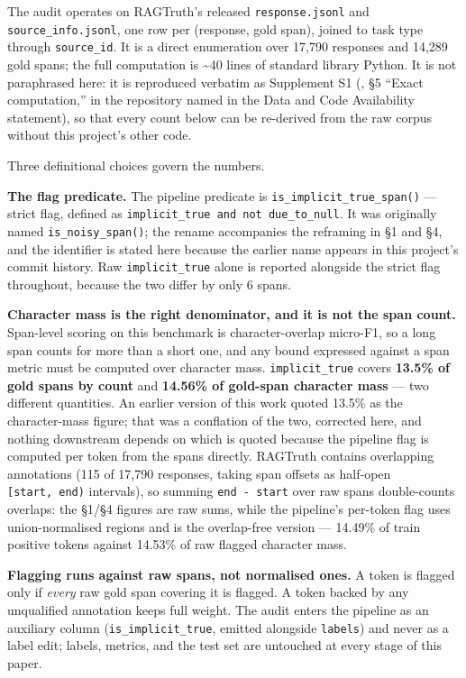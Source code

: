 \documentclass[11pt]{article}
\begin{document}
The audit operates on RAGTruth's released \texttt{response.jsonl} and \texttt{source\_info.jsonl}, one row
per (response, gold span), joined to task type through \texttt{source\_id}. It is a direct
enumeration over 17,790 responses and 14,289 gold spans; the full computation is \textasciitilde40 lines
of standard library Python. It is not paraphrased here: it is reproduced verbatim as
Supplement S1 (\texttt{}, §5 ``Exact computation,'' in the
repository named in the Data and Code Availability statement), so that every count below
can be re-derived from the raw corpus without this project's other code.

Three definitional choices govern the numbers.

\textbf{The flag predicate.} The pipeline predicate is \texttt{is\_implicit\_true\_span()} --- strict flag,
defined as \texttt{implicit\_true\ and\ not\ due\_to\_null}. It was originally named \texttt{is\_noisy\_span()};
the rename accompanies the reframing in §1 and §4, and the identifier is stated here because
the earlier name appears in this project's commit history. Raw \texttt{implicit\_true} alone is
reported alongside the strict flag throughout, because the two differ by only 6 spans.

\textbf{Character mass is the right denominator, and it is not the span count.} Span-level
scoring on this benchmark is character-overlap micro-F1, so a long span counts for more than
a short one, and any bound expressed against a span metric must be computed over character
mass. \texttt{implicit\_true} covers \textbf{13.5\% of gold spans by count} and \textbf{14.56\% of gold-span
character mass} --- two different quantities. An earlier version of this work quoted 13.5\%
as the character-mass figure; that was a conflation of the two, corrected here, and nothing
downstream depends on which is quoted because the pipeline flag is computed per token from
the spans directly. RAGTruth contains overlapping annotations (115 of 17,790 responses,
taking span offsets as half-open \texttt{{[}start,\ end)} intervals), so summing \texttt{end\ -\ start} over
raw spans double-counts overlaps: the §1/§4 figures are raw sums,
while the pipeline's per-token flag uses union-normalised regions and is the overlap-free
version --- 14.49\% of train positive tokens against 14.53\% of raw flagged character mass.

\textbf{Flagging runs against raw spans, not normalised ones.} A token is flagged only if
\emph{every} raw gold span covering it is flagged. A token backed by any unqualified annotation
keeps full weight. The audit enters the pipeline as an auxiliary column
(\texttt{is\_implicit\_true}, emitted alongside \texttt{labels}) and never as a label edit; labels, metrics,
and the test set are untouched at every stage of this paper.
\end{document}
